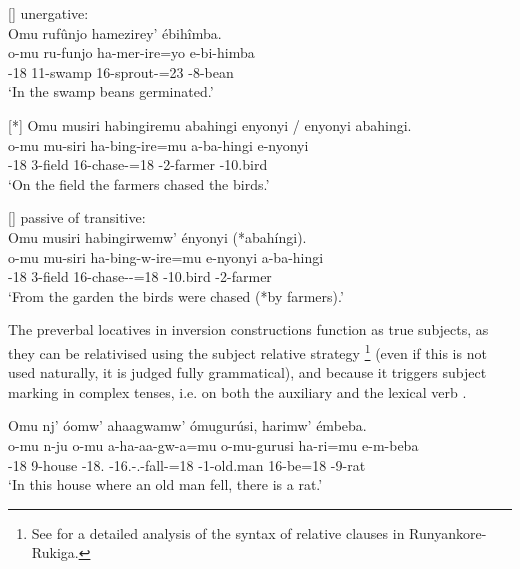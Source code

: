 \documentclass[output=paper]{langscibook}
\begin{document}
\ex
[]{
\label{bkm:Ref113445298}
unergative:\\
Omu rufûnjo hamezirey’ ébihîmba.\\
\gll
o-mu  ru-funjo  ha-mer-ire=yo  e-bi-himba\\
\AUG{}-18  11-swamp  16\SM{}-sprout-\PFV{}=23  \AUG{}-8-bean\\
\glt
‘In the swamp beans germinated.’\\
}


\z

\sn
[*]{
Omu musiri habingiremu abahingi enyonyi / enyonyi abahingi.\\
\gll
o-mu  mu-siri  ha-bing-ire=mu  a-ba-hingi   e-nyonyi \\
\AUG{}-18  3-field  16\SM{}-chase-\PFV{}=18  \AUG{}-2-farmer  \AUG{}-10.bird\\
\glt
‘On the field the farmers chased the birds.’\\
}


\z

\ea
[]{
\label{bkm:Ref113445357}
passive of transitive:\\
Omu musiri habingirwemw’ ényonyi (*abahíngi).\\
\gll
o-mu  mu-siri  ha-bing-w-ire=mu  e-nyonyi  a-ba-hingi\\
\AUG{}-18  3-field  16\SM{}-chase-\PASS{}-\PFV{}=18  \AUG{}-10.bird  \AUG{}-2-farmer\\
\glt
`From the garden the birds were chased (*by farmers).’\\
}


\z

The preverbal locatives in inversion constructions function as true subjects, as they can be relativised using the subject relative strategy \footnote{See \citet{Asiimwe2019} for a detailed analysis of the syntax of relative clauses in Runyankore-Rukiga.} (even if this is not used naturally, it is judged fully grammatical), and because it triggers subject marking in complex tenses, i.e. on both the auxiliary and the lexical verb .

\ea
\label{bkm:Ref117062915}
Omu nj’ óomw’ ahaagwamw’ ómugurúsi, harimw’ émbeba.\\
\gll
  o-mu  n-ju  o-mu  a-ha-aa-gw-a=mu    o-mu-gurusi  ha-ri=mu  e-m-beba\\
\AUG{}-18  9-house  \DEM{}-18.\PROX{}  \AUG{}-16.\REL{}-\N{}.\PST{}-fall-\FV{}=18  \AUG{}-1-old.man  16\SM{}-be=18  \AUG{}-9-rat\\
\glt 
`In this house where an old man fell, there is a rat.'\\
\end{document}
